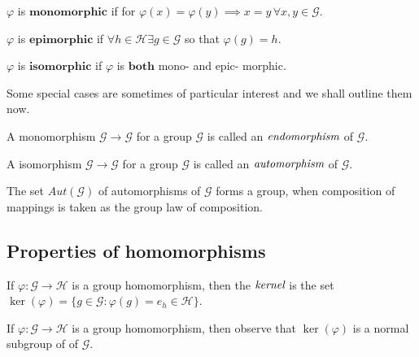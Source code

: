 \begin{defn}[Monomorphic]
	$\varphi$ is $\textbf{monomorphic}$ if for $\varphi(x) = \varphi(y) \implies x = y \, \forall x,y \in \mathcal{G}$.
\end{defn}

\begin{defn}[Epimorphic]
	$\varphi$ is $\textbf{epimorphic}$ if $\forall h \in \mathcal{H} \exists g \in \mathcal{G}$ so that $\varphi(g) = h$.
\end{defn}

\begin{defn}[Isomorphic]
	$\varphi$ is $\textbf{isomorphic}$ if $\varphi$ is $\textbf{both}$ mono- and epic- morphic.
\end{defn}

Some special cases are sometimes of particular interest and we shall outline them now.

\begin{defn}[Endomorphic]
	A monomorphism $\mathcal{G} \to \mathcal{G}$ for a group $\mathcal{G}$
	is called an $\emph{endomorphism}$ of $\mathcal{G}$.
\end{defn}

\begin{defn}[Automorphic]
	A isomorphism $\mathcal{G} \to \mathcal{G}$ for a group $\mathcal{G}$
	is called an $\emph{automorphism}$ of $\mathcal{G}$.
\end{defn}

\begin{rem}
	The set $Aut(\mathcal{G})$ of automorphisms of $\mathcal{G}$ forms a group, when composition of
	mappings is taken as the group law of composition.
\end{rem}

\subsection{Properties of homomorphisms} %
\label{subsec:propertiesofhomomorphisms}

\begin{defn}[kernel]
	If $\varphi : \mathcal{G} \to \mathcal{H}$ is a group homomorphism,
	then the $\emph{kernel}$ is the set
	$\ker(\varphi) = \{ g \in \mathcal{G} : \varphi (g) = e_h \in \mathcal{H} \}$.
\end{defn}

If $\varphi : \mathcal{G} \to \mathcal{H}$ is a group homomorphism, then
observe that $\ker(\varphi)$ is a normal subgroup of of $\mathcal{G}$.

